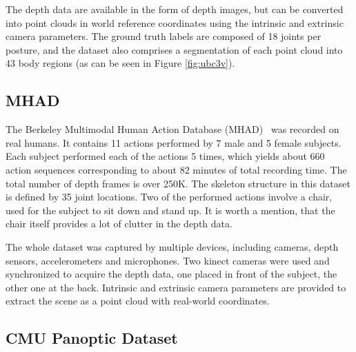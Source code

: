 \noindent
 The depth data are available in the form of depth images, but can be converted into point clouds in world reference coordinates using the intrinsic and extrinsic camera parameters. The ground truth labels are composed of 18 joints per posture, and the dataset also comprises a segmentation of each point cloud into 43 body regions (as can be seen in Figure \ref{fig:ubc3v}).

\subsection{MHAD}
The Berkeley Multimodal Human Action Database (MHAD)~\cite{Vidal:2013:BMC:2478277.2478412} was recorded on real humans. It contains 11 actions performed by 7 male and 5 female subjects. Each subject performed each of the actions 5 times, which yields about 660 action sequences corresponding to about 82 minutes of total recording time. The total number of depth frames is over 250K. The skeleton structure in this dataset is defined by 35 joint locations. Two of the performed actions involve a chair, used for the subject to sit down and stand up. It is worth a mention, that the chair itself provides a lot of clutter in the depth data.\par


\noindent The whole dataset was captured by multiple devices, including cameras, depth sensors, accelerometers and microphones. Two kinect cameras were used and synchronized to acquire the depth data, one placed in front of the subject, the other one at the back. Intrinsic and extrinsic camera parameters are provided to extract the scene as a point cloud with real-world coordinates.\par

\subsection{CMU Panoptic Dataset}

